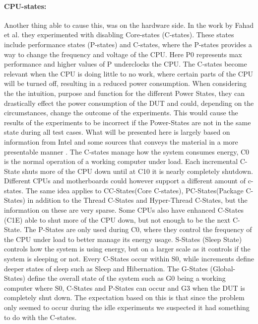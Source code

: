 \paragraph{CPU-states:} Another thing able to cause this, was on the hardware side. In the work by Fahad et al.\cite*[]{fahad2019comparative} they experimented with disabling Core-states (C-states). These states include performance states (P-states) and C-states\cite[]{PCStat}, where the P-states provides a way to change the frequency and voltage of the CPU. Here P0 represents max performance and higher values of P underclocks the CPU. The C-states become relevant when the CPU is doing little to no work, where certain parts of the CPU will be turned off, resulting in a reduced power consumption. When considering the the intuition, purpose and function for the different Power States, they can drastically effect the power consumption of the DUT and could, depending on the circumstances, change the outcome of the experiments. This would cause the results of the experiments to be incorrect if the Power-States are not in the same state during all test cases. What will be presented here is largely based on information from Intel\cite{CIntel} and some sources that conveys the material in a more presentable manner \cite{CMete,CLinux}. The C-states manage how the system consumes energy, C0 is the normal operation of a working computer under load. Each incremental C-State shuts more of the CPU down until at C10 it is nearly completely shutdown. Different CPUs and motherboards could however support a different amount of c-states. The same idea applies to CC-States(Core C-states), PC-States(Package C-States) in addition to the Thread C-States and Hyper-Thread C-States, but the information on these are very sparse. Some CPUs also have enhanced C-States (C1E) able to shut more of the CPU down, but not enough to be the next C-State. The P-States are only used during C0, where they control the frequency of the CPU under load to better manage its energy usage. S-States (Sleep State) controls how the system is using energy, but on a larger scale as it controls if the system is sleeping or not. Every C-States occur within S0, while increments define deeper states of sleep such as Sleep and Hibernation. The G-States (Global-States) define the overall state of the system such as G0 being a working computer where S0, C-States and P-States can occur and G3 when the DUT is completely shut down. The expectation based on this is that since the problem only seemed to occur during the idle experiments we suspected it had something to do with the C-states.

